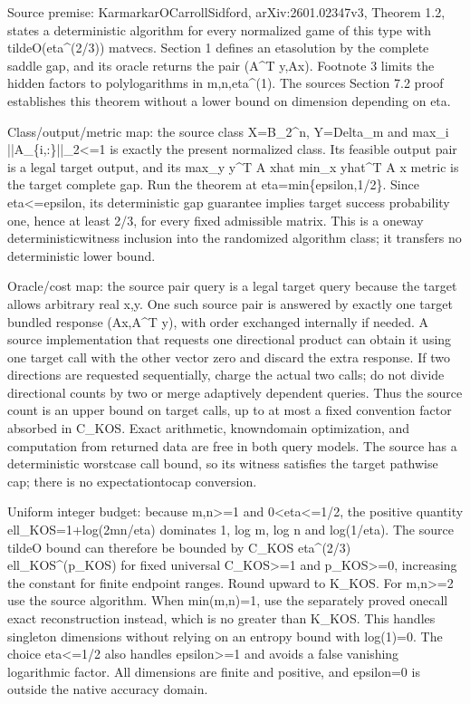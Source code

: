 \documentclass[10pt,a4paper]{article}
\begin{document}
Source premise: KarmarkarOCarrollSidford, arXiv:2601.02347v3, Theorem 1.2, states a deterministic algorithm for every normalized game of this type with tildeO(eta\textasciicircum{}(2/3)) matvecs. Section 1 defines an etasolution by the complete saddle gap, and its oracle returns the pair (A\textasciicircum{}T y,Ax). Footnote 3 limits the hidden factors to polylogarithms in m,n,eta\textasciicircum{}(1). The sources Section 7.2 proof establishes this theorem without a lower bound on dimension depending on eta.

Class/output/metric map: the source class X=B\_2\textasciicircum{}n, Y=Delta\_m and max\_i ||A\_\{i,:\}||\_2<=1 is exactly the present normalized class. Its feasible output pair is a legal target output, and its max\_y y\textasciicircum{}T A xhat  min\_x yhat\textasciicircum{}T A x metric is the target complete gap. Run the theorem at eta=min\{epsilon,1/2\}. Since eta<=epsilon, its deterministic gap guarantee implies target success probability one, hence at least 2/3, for every fixed admissible matrix. This is a oneway deterministicwitness inclusion into the randomized algorithm class; it transfers no deterministic lower bound.

Oracle/cost map: the source pair query is a legal target query because the target allows arbitrary real x,y. One such source pair is answered by exactly one target bundled response (Ax,A\textasciicircum{}T y), with order exchanged internally if needed. A source implementation that requests one directional product can obtain it using one target call with the other vector zero and discard the extra response. If two directions are requested sequentially, charge the actual two calls; do not divide directional counts by two or merge adaptively dependent queries. Thus the source count is an upper bound on target calls, up to at most a fixed convention factor absorbed in C\_KOS. Exact arithmetic, knowndomain optimization, and computation from returned data are free in both query models. The source has a deterministic worstcase call bound, so its witness satisfies the target pathwise cap; there is no expectationtocap conversion.

Uniform integer budget: because m,n>=1 and 0<eta<=1/2, the positive quantity ell\_KOS=1+log(2mn/eta) dominates 1, log m, log n and log(1/eta). The source tildeO bound can therefore be bounded by C\_KOS eta\textasciicircum{}(2/3) ell\_KOS\textasciicircum{}(p\_KOS) for fixed universal C\_KOS>=1 and p\_KOS>=0, increasing the constant for finite endpoint ranges. Round upward to K\_KOS. For m,n>=2 use the source algorithm. When min(m,n)=1, use the separately proved onecall exact reconstruction instead, which is no greater than K\_KOS. This handles singleton dimensions without relying on an entropy bound with log(1)=0. The choice eta<=1/2 also handles epsilon>=1 and avoids a false vanishing logarithmic factor. All dimensions are finite and positive, and epsilon=0 is outside the native accuracy domain.
\end{document}
